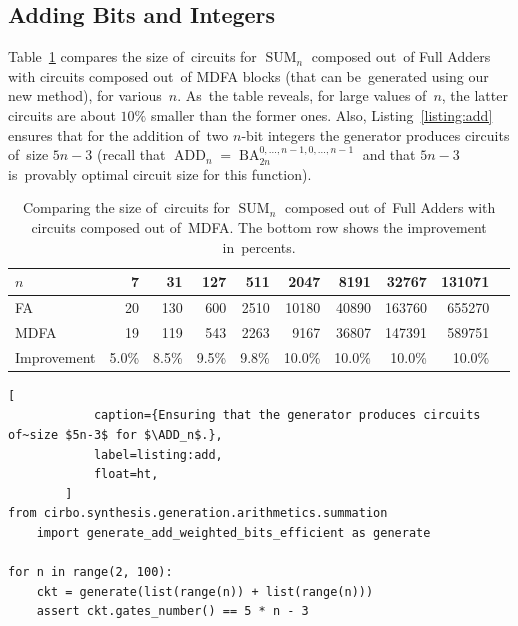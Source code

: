 \documentclass[a4paper, UKenglish, cleveref, autoref,  thm-restate]{lipics-v2021}
\DeclareMathOperator{\SUM}{SUM}
\DeclareMathOperator{\ADD}{ADD}
\DeclareMathOperator{\BA}{BA}
\begin{document}
    \subsection{Adding Bits and Integers}
    Table~\ref{table:first} compares the size of~circuits for $\SUM_n$
    composed out~of Full Adders with circuits composed out~of MDFA blocks
    (that can be~generated using our new method), for various~$n$. As~the table reveals,
    for large values of~$n$, the latter circuits are about $10\%$ smaller than the former ones. Also, Listing~\ref{listing:add} ensures that for the addition of~two $n$-bit integers the generator produces circuits of~size $5n-3$ (recall that $\ADD_n=\BA_{2n}^{0,\dotsc,n-1,0,\dotsc,n-1}$ and that $5n-3$ is~provably optimal circuit size for this function).

    \begin{table}[ht]
        \caption{Comparing the size of~circuits for $\SUM_n$ composed out of~Full Adders with
            circuits composed out of~MDFA. The bottom row shows the improvement in~percents.}
        \label{table:first}
        \begin{center}
            \begin{tabular}{lrrrrrrrrr}
                \toprule
                $n$ & 7 & 31 & 127 & 511 & 2047 & 8191 & 32767 & 131071 \\
                \midrule
                FA & 20 & 130 & 600 & 2510 & 10180 & 40890 & 163760 & 655270 \\
                MDFA & 19 & 119 & 543 & 2263 & 9167 & 36807 & 147391 & 589751 \\
                Improvement  & 5.0\%  & 8.5\%  & 9.5\%  & 9.8\%  & 10.0\%  & 10.0\%  & 10.0\%  & 10.0\% \\
                \bottomrule
            \end{tabular}
        \end{center}
    \end{table}

        \begin{lstlisting}[
            caption={Ensuring that the generator produces circuits of~size $5n-3$ for $\ADD_n$.},
            label=listing:add,
            float=ht,
        ]
from cirbo.synthesis.generation.arithmetics.summation
    import generate_add_weighted_bits_efficient as generate

for n in range(2, 100):
    ckt = generate(list(range(n)) + list(range(n)))
    assert ckt.gates_number() == 5 * n - 3
        \end{lstlisting}
\end{document}
